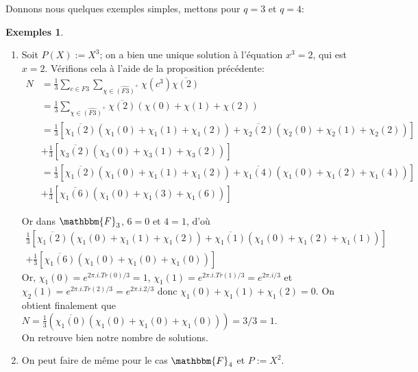 \documentclass[12pt]{article}
\theoremstyle{remark}\newtheorem{note}{Note}
\theoremstyle{remark}\newtheorem{nota}{Notation}
\newcommand{\F}{\mathbbm{F}}
\theoremstyle{definition}
\newtheorem*{examples}{Exemples}
\begin{document}
Donnons nous quelques exemples simples, mettons pour $q=3$ et $q=4$:

\begin{examples}
	\begin{enumerate}[label = \roman*)]
	\item Soit $P(X) := X^3$; on a bien une unique solution à l'équation $x^3 = 2$, qui est $x=2$. Vérifions cela à l'aide de la proposition précédente:
\begin{align*}
N &= \displaystyle\frac{1}{3}\sum_{c\in F3}\sum_{\chi\in\hat{(F3)}^+} \chi(c^3)\overline{\chi(2)}\\

&=\displaystyle\frac{1}{3}\sum_{\chi\in\hat{(F3)}^+}\overline{\chi(2)}(\chi(0) + \chi(1) + \chi(2))\\

&=\displaystyle\frac{1}{3}\left[\overline{\chi_1(2)}(\chi_1(0) + \chi_1(1) + \chi_1(2)) + \overline{\chi_2(2)}(\chi_2(0) + \chi_2(1) + \chi_2(2))\right]\\ 

&+\displaystyle\frac{1}{3} \left[\overline{\chi_3(2)}(\chi_3(0) + \chi_3(1) + \chi_3(2))\right]\\

&=\displaystyle\frac{1}{3}\left[\overline{\chi_1(2)}(\chi_1(0) + \chi_1(1) + \chi_1(2)) + \overline{\chi_1(4)}(\chi_1(0) + \chi_1(2) + \chi_1(4))\right]\\

&+\displaystyle\frac{1}{3}\left[\overline{\chi_1(6)}(\chi_1(0) + \chi_1(3) + \chi_1(6))\right]
\end{align*}

Or  dans $\F_3$, $6=0$ et $4=1$, d'où
\begin{align*}
\displaystyle\frac{1}{3}\left[\overline{\chi_1(2)}(\chi_1(0) + \chi_1(1) + \chi_1(2)) + \overline{\chi_1(1)}(\chi_1(0) + \chi_1(2) + \chi_1(1))\right]\\
+\displaystyle\frac{1}{3}\left[\overline{\chi_1(6)}(\chi_1(0) + \chi_1(0) + \chi_1(0))\right]
\end{align*}
Or, $\chi_1(0) = e^{2\pi.i.Tr(0)/3} = 1$, $\chi_1(1) = e^{2\pi.i.Tr(1)/3} = e^{2\pi.i/3}$ et\\  $\chi_2(1) = e^{2\pi.i.Tr(2)/3} = e^{2\pi.i.2/3}$ donc $\chi_1(0)+\chi_1(1)+\chi_1(2) = 0$.\newline
On obtient finalement que \newline
$N = \frac{1}{3} (\overline{\chi_1(0)}(\chi_1(0)+ \chi_1(0) + \chi_1(0))) = 3/3 = 1$.\\
On retrouve bien notre nombre de solutions. 
	\item 
On peut faire de même pour le cas $\F_4$ et $P := X^2$.
	\end{enumerate}

\end{examples}
\end{document}
